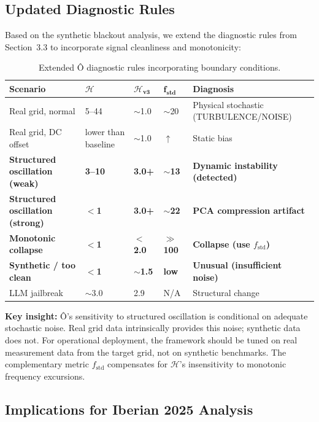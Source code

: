 \documentclass[11pt,a4paper]{article}
\begin{document}
\subsection{Updated Diagnostic Rules}

Based on the synthetic blackout analysis, we extend the diagnostic rules from Section~3.3 to incorporate signal cleanliness and monotonicity:

\begin{table}[H]
\centering
\caption{Extended Ô diagnostic rules incorporating boundary conditions.}
\label{tab:extended_rules}
\begin{tabular}{lllll}
\toprule
\textbf{Scenario} & $\boldsymbol{\mathcal{H}}$ & $\boldsymbol{\mathcal{H}_{\text{v3}}}$ & $\boldsymbol{f_{\text{std}}}$ & \textbf{Diagnosis} \\
\midrule
Real grid, normal & 5--44 & $\sim$1.0 & $\sim$20 & Physical stochastic (TURBULENCE/NOISE) \\
Real grid, DC offset & lower than baseline & $\sim$1.0 & $\uparrow$ & Static bias \\
\textbf{Structured oscillation (weak)} & \textbf{3--10} & \textbf{3.0+} & \textbf{$\sim$13} & \textbf{Dynamic instability (detected)} \\
\textbf{Structured oscillation (strong)} & \textbf{$<$1} & \textbf{3.0+} & \textbf{$\sim$22} & \textbf{PCA compression artifact} \\
\textbf{Monotonic collapse} & \textbf{$<$1} & \textbf{$<$2.0} & \textbf{$\gg$ 100} & \textbf{Collapse (use $f_{\text{std}}$)} \\
\textbf{Synthetic / too clean} & \textbf{$<$1} & \textbf{$\sim$1.5} & \textbf{low} & \textbf{Unusual (insufficient noise)} \\
LLM jailbreak & $\sim$3.0 & 2.9 & N/A & Structural change \\
\bottomrule
\end{tabular}
\end{table}

\textbf{Key insight:} Ô's sensitivity to structured oscillation is conditional on adequate stochastic noise. Real grid data intrinsically provides this noise; synthetic data does not. For operational deployment, the framework should be tuned on real measurement data from the target grid, not on synthetic benchmarks. The complementary metric $f_{\text{std}}$ compensates for $\mathcal{H}$'s insensitivity to monotonic frequency excursions.

\subsection{Implications for Iberian 2025 Analysis}
\end{document}
